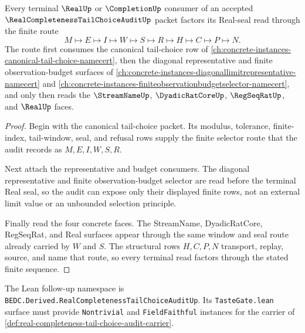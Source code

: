 \begin{theorem}
\label{thm:real-completeness-tail-choice-audit-factorization}
Every terminal $\RealUp$ or $\CompletionUp$ consumer of an accepted $\RealCompletenessTailChoiceAuditUp$ packet factors its Real-seal read through the finite route
$$
M\longmapsto E\longmapsto I\longmapsto W\longmapsto S\longmapsto R\longmapsto H\longmapsto C\longmapsto P\longmapsto N.
$$
The route first consumes the canonical tail-choice row of \autoref{ch:concrete-instances-canonical-tail-choice-namecert}, then the diagonal representative and finite observation-budget surfaces of \autoref{ch:concrete-instances-diagonallimitrepresentative-namecert} and \autoref{ch:concrete-instances-finiteobservationbudgetselector-namecert}, and only then reads the $\StreamNameUp$, $\DyadicRatCoreUp$, $\RegSeqRatUp$, and $\RealUp$ faces.
\end{theorem}
\begin{proof}
Begin with the canonical tail-choice packet. Its modulus, tolerance, finite-index, tail-window, seal, and refusal rows supply the finite selector route that the audit records as $M,E,I,W,S,R$.

Next attach the representative and budget consumers. The diagonal representative and finite observation-budget selector are read before the terminal Real seal, so the audit can expose only their displayed finite rows, not an external limit value or an unbounded selection principle.

Finally read the four concrete faces. The StreamName, DyadicRatCore, RegSeqRat, and Real surfaces appear through the same window and seal route already carried by $W$ and $S$. The structural rows $H,C,P,N$ transport, replay, source, and name that route, so every terminal read factors through the stated finite sequence.
\end{proof}

The Lean follow-up namespace is \texttt{BEDC.Derived.RealCompletenessTailChoiceAuditUp}. Its \texttt{TasteGate.lean} surface must provide \texttt{Nontrivial} and \texttt{FieldFaithful} instances for the carrier of \autoref{def:real-completeness-tail-choice-audit-carrier}.


